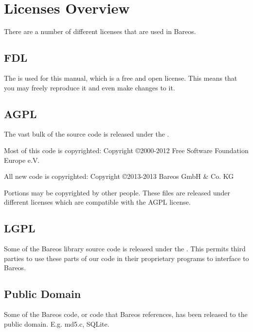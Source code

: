 
\section{Licenses Overview}

There are a number of different licenses that are used in Bareos.

\subsection*{FDL}

The  is used for this manual,
which is a free and open license. This means that you may freely
reproduce it and even make changes to it.


\subsection*{AGPL}

The vast bulk of the source code is released under the
.

Most of this code is copyrighted: Copyright \copyright 2000-2012
Free Software Foundation Europe e.V.

All new code is copyrighted: Copyright \copyright 2013-2013 Bareos GmbH \& Co. KG

Portions may be copyrighted by other people.  These files are released
under different licenses which are compatible with the AGPL license.

\subsection*{LGPL}

Some of the Bareos library source code is released under the
. This
permits third parties to use these parts of our code in their proprietary
programs to interface to Bareos.

\subsection*{Public Domain}

Some of the Bareos code, or code that Bareos references, has been released
to the public domain. E.g. md5.c, SQLite.

